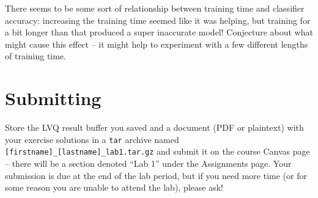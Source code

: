 \documentclass[11pt]{cselabheader}
\begin{document}
\begin{ex}
  There seems to be some sort of relationship between training time and classifier accuracy: increasing the training time seemed like it was helping, but training for a bit longer than that produced a super inaccurate model! Conjecture about what might cause this effect -- it might help to experiment with a few different lengths of training time.
\end{ex}

\section{Submitting}

Store the LVQ result buffer you saved and a document (PDF or plaintext) with your exercise solutions in a \texttt{tar} archive named \texttt{[firstname]\_[lastname]\_lab1.tar.gz} and submit it on the course Canvas page -- there will be a section denoted ``Lab 1'' under the Assignments page. Your submission is due at the end of the lab period, but if you need more time (or for some reason you are unable to attend the lab), please ask!
\end{document}
